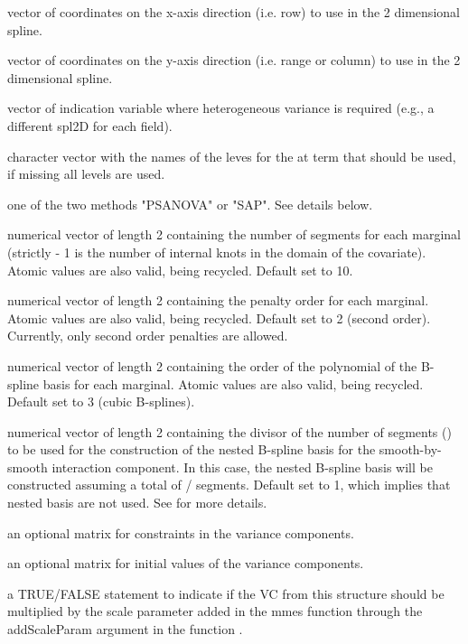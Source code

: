\documentclass[a4paper]{book}
\begin{document}
\begin{Arguments}
\begin{ldescription}
\item[\code{x.coord}] vector of coordinates on the x-axis direction (i.e. row) to use in the 2 dimensional spline.
\item[\code{y.coord}] vector of coordinates on the y-axis direction (i.e. range or column) to use in the 2 dimensional spline.
\item[\code{at.var}] vector of indication variable where heterogeneous variance is required (e.g., a different spl2D for each field).
\item[\code{at.levels}] character vector with the names of the leves for the at term that should be used, if missing all levels are used.
\item[\code{type}] one of the two methods "PSANOVA" or "SAP". See details below.
\item[\code{nsegments}] numerical vector of length 2 containing the number of segments for each marginal (strictly  - 1 is the number of internal knots in the domain of the covariate). Atomic values are also valid, being recycled. Default set to 10.
\item[\code{penaltyord}] numerical vector of length 2 containing the penalty order for each marginal. Atomic values are also valid, being recycled. Default set to 2 (second order). Currently, only second order penalties are allowed.
\item[\code{degree}] numerical vector of length 2 containing the order of the polynomial of the B-spline basis for each marginal. Atomic values are also valid, being recycled. Default set to 3 (cubic B-splines).
\item[\code{nestorder}] numerical vector of length 2 containing the divisor of the number of segments () to be used for the construction of the nested B-spline basis for the smooth-by-smooth interaction component. In this case, the nested B-spline basis will be constructed assuming a total of / segments. Default set to 1, which implies that nested basis are not used. See  for more details.
\item[\code{thetaC}] an optional matrix for constraints in the variance components.
\item[\code{theta}] an optional matrix for initial values of the variance components.
\item[\code{sp}] a TRUE/FALSE statement to indicate if the VC from this structure should be multiplied by the scale parameter added in the mmes function through the addScaleParam argument in the  function .

\end{ldescription}
\end{Arguments}
\end{document}

